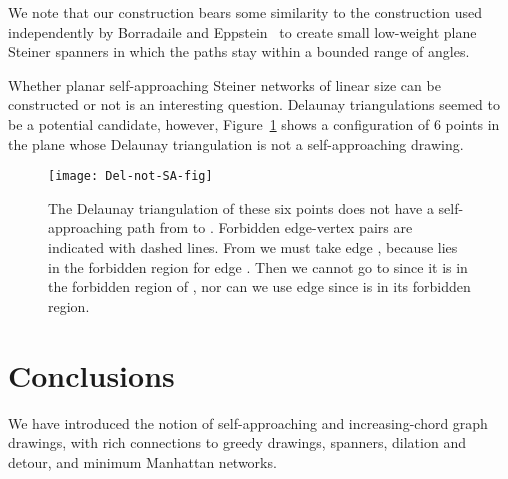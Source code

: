 \documentclass[11pt]{article}
\begin{document}
We note that our construction bears some similarity to the construction used independently by Borradaile and Eppstein~\cite{Borradaile} to create small low-weight plane Steiner spanners in which the paths stay within a bounded range of angles.



Whether planar self-approaching Steiner networks of linear size can be constructed or not is an interesting question.
Delaunay triangulations seemed to be a potential candidate, however, Figure~\ref{fig:Del-not-SA} shows a configuration of 6 points in the plane whose Delaunay triangulation is not a self-approaching drawing.

\begin{figure}
\begin{center}
\texttt{[image: Del-not-SA-fig]}
\vspace{1cm}
\caption{The Delaunay triangulation of these six points does not have a self-approaching path from  to .  Forbidden edge-vertex pairs are indicated with dashed lines.  From  we must take edge , because  lies in the forbidden region for edge .   Then we cannot go to  since it is in the forbidden region of , nor can we use edge  since  is in its forbidden region.}
\label{fig:Del-not-SA}
\end{center}
\end{figure}
















\section{Conclusions}

We have introduced the notion of self-approaching and increasing-chord graph drawings, with rich connections to greedy drawings, spanners, dilation and detour, and minimum Manhattan networks.
\end{document}
